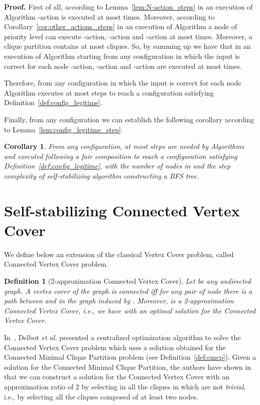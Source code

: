 \documentclass[11pt,letterpaper,onecolumn]{article}
\newtheorem{definition}{Definition}
\newtheorem{corollary}{Corollary}
\newenvironment{proof}{\noindent \begin{rm}{\textbf{Proof.} }}{\hspace*{\fill}\par\end{rm} \vspace{.3cm}}
\begin{document}
\begin{proof}
First of all, according to Lemma~\ref{lem:N-action_steps} in an execution of Algorithm  -action is executed at most  times. Moreover, according to Corollary~\ref{cor:other_actions_steps} in an execution of Algorithm  a node  of priority level  can execute -action, -action and -action at most  times. Moreover, a clique partition contains at most  cliques. So, by summing up we have that in an execution of Algorithm  starting from any configuration in which the input  is correct for each node  -action, -action and -action are executed at most  times.

Therefore, from any configuration in which the input  is correct for each node  Algorithm  executes at most  steps to reach a configuration satisfying Definition~\ref{def:config_legitime}.
\end{proof}

Finally, from any configuration we can establish the following corollary according to Lemma~\ref{lem:config_legitime_step}.

\begin{corollary}
\label{cor:config_legitime_step_avec_BFS}
From any configuration, at most  steps are needed by Algorithms  and  executed following a fair composition to reach a configuration satisfying Definition~\ref{def:config_legitime}, with  the number of nodes in  and  the step complexity of self-stabilizing algorithm  constructing a BFS tree.
\end{corollary}

\section{Self-stabilizing Connected Vertex Cover}
\label{sec:cvc}

We define below an extension of the classical Vertex Cover problem, called Connected Vertex Cover problem.

\begin{definition}[2-approximation Connected Vertex Cover]
\label{def:cvc}
Let  be any undirected graph. A vertex cover  of the graph  is \emph{connected} iff for any pair of node  there is a path between  and  in the graph induced by . Moreover,  is a 2-approximation Connected Vertex Cover, i.e., we have  with  an optimal solution for the Connected Vertex Cover.
\end{definition}

In~\cite{DelbotLP13}, Delbot \emph{et al.} presented a centralized optimization algorithm to solve the Connected Vertex Cover problem which uses a solution obtained for the Connected Minimal Clique Partition problem (see Definition~\ref{def:cmcp}). Given a solution  for the Connected Minimal Clique Partition, the authors have shown in~\cite{DelbotLP13} that we can construct a solution  for the Connected Vertex Cover with an approximation ratio of 2 by selecting in  all the cliques in  which are not \emph{trivial}, i.e., by selecting all the cliques composed of at least two nodes.  
\end{document}
